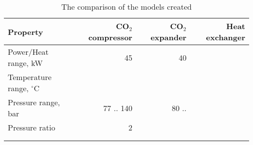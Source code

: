 \begin{table}
\label{tab:DiscussionComparison}
\caption{The comparison of the models created}
\begin{center}
\begin{tabulary}{0.9\textwidth}{LRRR}
\toprule
Property    	                &	CO$_2$ compressor   & CO$_2$	expander    & Heat exchanger    \\
\midrule
Power/Heat range, kW            &       45              &       40              &                   \\
Temperature range, $^\circ$C    &                       &                       &                   \\
Pressure range, bar             &   77 .. 140           &     80 ..             &                   \\
Pressure ratio                  &   2                   &                       &                   \\
& & & \\
& & & \\
\bottomrule
\end{tabulary}
\end{center}
\end{table}